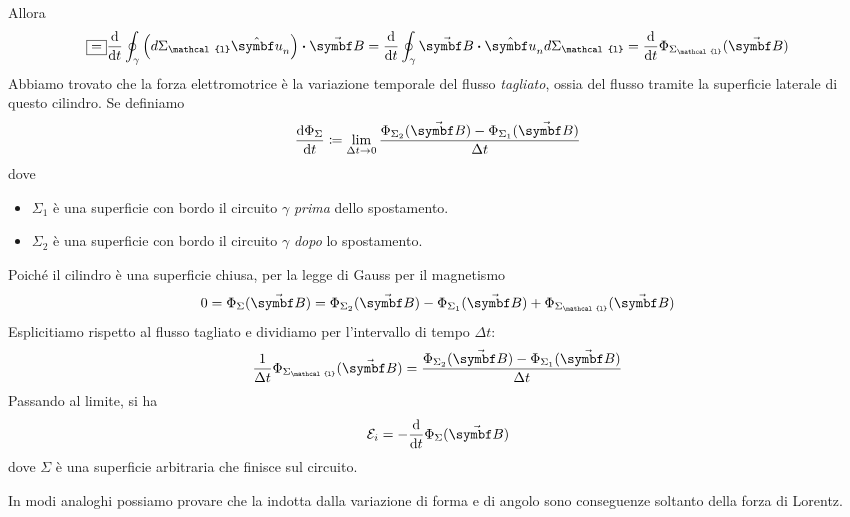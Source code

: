\begin{demonstration}
	Allora
	\begin{equation*}
		\squarequal \dv{t} \oint_{\gamma}\left(d\Sigma_{\mathcal{l}}\vbh{u}_n\right)\vdot \vba{B}=\dv{t} \oint_{\gamma}\vba{B} \vdot \vbh{u}_nd\Sigma_{\mathcal{l}}=\dv{t}\Phi_{\Sigma_{\mathcal{l}}}(\vba{B})
	\end{equation*}
	Abbiamo trovato che la forza elettromotrice è la variazione temporale del flusso \textit{tagliato}, ossia del flusso tramite la superficie laterale di questo cilindro. Se definiamo
	\begin{equation*}
		\dv{\Phi_{\Sigma}}{t}\coloneqq\lim_{\Delta t\to 0}\frac{\Phi_{\Sigma_2}(\vba{B})-\Phi_{\Sigma_1}(\vba{B})}{\Delta t}
	\end{equation*}
	dove
	\begin{itemize}
		\item $\Sigma_1$ è una superficie con bordo il circuito $\gamma$ \textit{prima} dello spostamento.
		\item $\Sigma_2$  è una superficie con bordo il circuito $\gamma$ \textit{dopo} lo spostamento.
	\end{itemize}
	Poiché il cilindro è una superficie chiusa, per la legge di Gauss per il magnetismo
	\begin{equation*}
		0=\Phi_{\Sigma}(\vba{B})=\Phi_{\Sigma_2}(\vba{B})-\Phi_{\Sigma_1}(\vba{B})+\Phi_{\Sigma_{\mathcal{l}}}(\vba{B})
	\end{equation*}
	Esplicitiamo rispetto al flusso tagliato e dividiamo per l'intervallo di tempo $\Delta t$:
	\begin{equation*}
		\frac{1}{\Delta t}\Phi_{\Sigma_{\mathcal{l}}}(\vba{B})=\frac{\Phi_{\Sigma_2}(\vba{B})-\Phi_{\Sigma_1}(\vba{B})}{\Delta t}
	\end{equation*}
	Passando al limite, si ha
	\begin{equation*}
		\mathcal{E}_i=-\dv{t}\Phi_{\Sigma}(\vba{B})
	\end{equation*}
	dove $\Sigma$ è una superficie arbitraria che finisce sul circuito.
\end{demonstration}
In modi analoghi possiamo provare che la \fem indotta dalla variazione di forma e di angolo sono conseguenze soltanto della forza di Lorentz.
